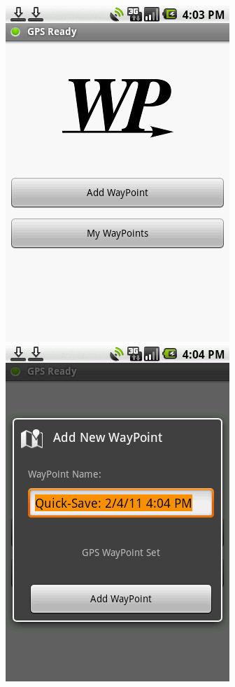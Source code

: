 \begin{figure}[H]
\centering
\includegraphics[scale=0.5]{czlonkowie/3/1waypoint.png}
\includegraphics[scale=0.5]{czlonkowie/3/2waypoint.png}

\end{figure}
